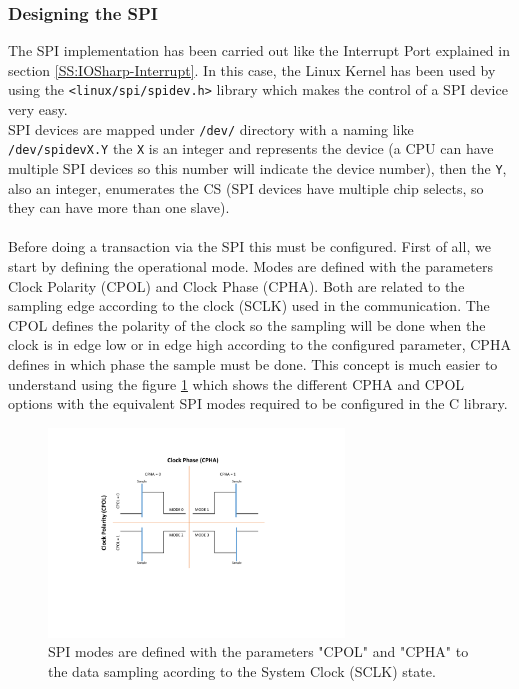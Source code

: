 \subsubsection{Designing the SPI}\label{SSS:IOSharp-SPI-Design}
The SPI implementation has been carried out like the Interrupt Port explained in section \ref{SS:IOSharp-Interrupt}. In this case, the Linux Kernel has been used by using the \verb!<linux/spi/spidev.h>! library which makes the control of a SPI device very easy.
\\
SPI devices are mapped under \verb!/dev/! directory with a naming like \verb!/dev/spidevX.Y! the \verb!X! is an integer and represents the device (a CPU can have multiple SPI devices so this number will indicate the device number), then the \verb!Y!, also an integer, enumerates the \gls{CS} (SPI devices have multiple chip selects, so they can have more than one slave).
\\
\\
Before doing a transaction via the SPI this must be configured. First of all, we start by defining the operational mode. Modes are defined with the parameters Clock Polarity (CPOL) and Clock Phase (CPHA). Both are related to the sampling edge according to the clock (SCLK) used in the communication. The CPOL defines the polarity of the clock so the sampling will be done when the clock is in edge low or in edge high according to the configured parameter, CPHA defines in which phase the sample must be done. This concept is much easier to understand using the figure \ref{fig:spi-modes} which shows the different CPHA and CPOL options with the equivalent SPI modes required to be configured in the C library.

\begin{figure}[H]\begin{center}
 \centering
  \captionsetup{justification=centering}
  \includegraphics[width=0.7\textwidth]{pictures/iosharp/spi-modes}
  \caption{SPI modes are defined with the parameters "CPOL" and "CPHA" to the data sampling acording to the System Clock (SCLK) state.\label{fig:spi-modes}}
\end{center}\end{figure}

